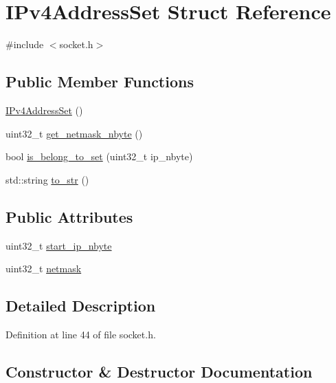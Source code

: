 \hypertarget{structIPv4AddressSet}{}\section{I\+Pv4\+Address\+Set Struct Reference}
\label{structIPv4AddressSet}


{\ttfamily \#include $<$socket.\+h$>$}

\subsection*{Public Member Functions}
\begin{DoxyCompactItemize}
\item 
\hyperlink{structIPv4AddressSet_af57bbe043cc98191e9289f6b9c439c12}{I\+Pv4\+Address\+Set} ()
\item 
uint32\+\_\+t \hyperlink{structIPv4AddressSet_a26396e29751384e9be47ccce2fa40b83}{get\+\_\+netmask\+\_\+nbyte} ()
\item 
bool \hyperlink{structIPv4AddressSet_a58db031236c16266a8b994f3f62b3362}{is\+\_\+belong\+\_\+to\+\_\+set} (uint32\+\_\+t ip\+\_\+nbyte)
\item 
std\+::string \hyperlink{structIPv4AddressSet_a7670a6e94983337f41b59d455f0e584e}{to\+\_\+str} ()
\end{DoxyCompactItemize}
\subsection*{Public Attributes}
\begin{DoxyCompactItemize}
\item 
uint32\+\_\+t \hyperlink{structIPv4AddressSet_a713c0748adbcb67c8e00ae98bfefabcb}{start\+\_\+ip\+\_\+nbyte}
\item 
uint32\+\_\+t \hyperlink{structIPv4AddressSet_aa9b5e4e4183a96b2050659ca4f2cfe3d}{netmask}
\end{DoxyCompactItemize}


\subsection{Detailed Description}


Definition at line 44 of file socket.\+h.



\subsection{Constructor \& Destructor Documentation}
